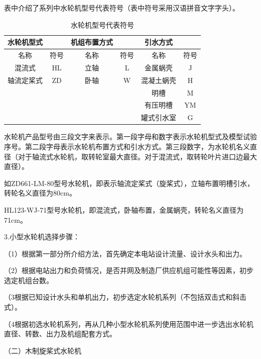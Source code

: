 \documentclass{ctexbook}
\begin{document}
表中介绍了系列中水轮机型号代表符号（表中符号采用汉语拼音文字字头）。
\begin{table}[htbp]
	\centering
	\caption{水轮机型号代表符号}
	\begin{tabular}{cccc|c|c|}
		\toprule
		\multicolumn{1}{|c|}{水轮机型式} & \multicolumn{1}{c|}{} & \multicolumn{1}{c|}{机组布置方式} &       & 引水方式  &  \\
		\midrule
		\multicolumn{1}{|c|}{名称} & \multicolumn{1}{c|}{符号} & \multicolumn{1}{c|}{名称} & 符号    & 名称    & 符号 \\
		\midrule
		\multicolumn{1}{|c|}{混流式} & \multicolumn{1}{c|}{HL} & \multicolumn{1}{c|}{立轴} & L     & 金属蜗壳  & J \\
		\midrule
		\multicolumn{1}{|c|}{轴流定桨式} & \multicolumn{1}{c|}{ZD} & \multicolumn{1}{c|}{卧轴} & W     & 混凝土蜗壳 & H \\
		\midrule
		&       &       &       & 明槽    & M \\
		\cmidrule{5-6}          &       &       &       & 有压明槽  & YM \\
		\cmidrule{5-6}          &       &       &       & 罐式引水室 & G \\
		\cmidrule{5-6}    \end{tabular}%
	\label{tab:shuilunjixinghao}%
\end{table}%



水轮机产品型号由三段文字来表示。第一段字母和数字表示水轮机型式及模型试验序号。第二段字母表示水轮机布置方式和引水方式。第三段数字，为水轮机名义直径（对于轴流式水轮机，取转轮室最大直径。对于混流式，取转轮叶片进口边最大直径）。

如ZD661-LM-80型号水轮机，即表示轴流定桨式（旋桨式），立轴布置明槽引水，转轮名义直径为80cm。

HL123-WJ-71型号水轮机，即混流式，卧轴布置，金属蜗壳，转轮名义直径为71cm。

3.小型水轮机选择步骤：

（1）根据第一部分所介绍方法，首先确定本电站设计流量、设计水头和出力。

（2）根据电站出力和负荷情况，是否并网及制造厂供应机组可能性等因素，初步选定机组台数。

（3根据已知设计水头和单机出力，初步选定水轮机系列（不包括双击式和斜击式）。

（4根据初选水轮机系列，再从几种小型水轮机系列使用范围中进一步选出水轮机直径、转数、出力及机组配套方式。

（二）木制旋桨式水轮机
\end{document}
